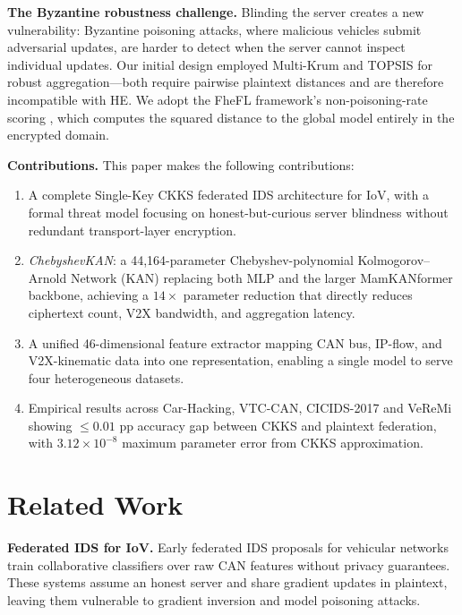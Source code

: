 \documentclass[conference]{IEEEtran}
\begin{document}
\textbf{The Byzantine robustness challenge.}
Blinding the server creates a new vulnerability: Byzantine poisoning attacks,
where malicious vehicles submit adversarial updates, are harder to detect
when the server cannot inspect individual updates. Our initial design
\cite{generation1report} employed Multi-Krum \cite{blanchard2017machine} and
TOPSIS \cite{hwang1981topsis} for robust aggregation---both require pairwise
plaintext distances and are therefore incompatible with HE. We adopt the
FheFL framework's non-poisoning-rate scoring \cite{fhefl2023}, which computes
the squared distance to the global model entirely in the encrypted domain.

\textbf{Contributions.} This paper makes the following contributions:
\begin{enumerate}
  \item A complete Single-Key CKKS federated IDS architecture for IoV, with
        a formal threat model focusing on honest-but-curious server blindness
        without redundant transport-layer encryption.
  \item \emph{ChebyshevKAN}: a 44,164-parameter Chebyshev-polynomial
        Kolmogorov--Arnold Network (KAN) \cite{liu2024kan} replacing both
        MLP and the larger MamKANformer backbone, achieving a $14\times$
        parameter reduction that directly reduces ciphertext count,
        V2X bandwidth, and aggregation latency.
  \item A unified 46-dimensional feature extractor mapping CAN bus,
        IP-flow, and V2X-kinematic data into one representation, enabling a
        single model to serve four heterogeneous datasets.
  \item Empirical results across Car-Hacking, VTC-CAN, CICIDS-2017 and
        VeReMi showing ${\le}0.01$ pp accuracy gap between CKKS and
        plaintext federation, with $3.12{\times}10^{-8}$ maximum parameter
        error from CKKS approximation.
\end{enumerate}

\section{Related Work}

\textbf{Federated IDS for IoV.}
Early federated IDS proposals for vehicular networks \cite{li2020federated}
train collaborative classifiers over raw CAN features without privacy
guarantees. These systems assume an honest server and share gradient
updates in plaintext, leaving them vulnerable to gradient inversion
\cite{zhu2019deep} and model poisoning attacks.
\end{document}
